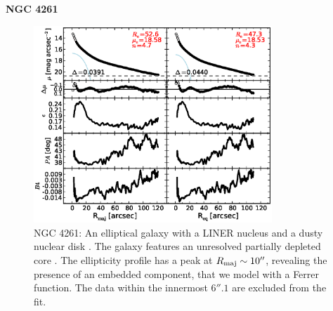 \documentclass[preprint2]{emulateapj}
\newcommand{\fitfigurewidth}{0.8\textwidth}
\begin{document}
  \clearpage\newpage\noindent
  {\bf NGC 4261 \\}

  \begin{figure}[h]
  \begin{center}
  \includegraphics[width=\fitfigurewidth]{images/n4261_1Dfit.eps}
  \caption{NGC 4261: 
  An elliptical galaxy with a LINER nucleus \citep{veroncettyveron2006}
  and a dusty nuclear disk \citep{tran2001}.
  The galaxy features an unresolved partially depleted core \citep{rusli2013}. %
  The ellipticity profile has a peak at $R_{\rm maj} \sim 10''$, revealing the presence of an embedded component, 
  that we model with a Ferrer function.
  The data within the innermost $6''.1$ are excluded from the fit.
  }
  \end{center}
  \end{figure}
\end{document}
